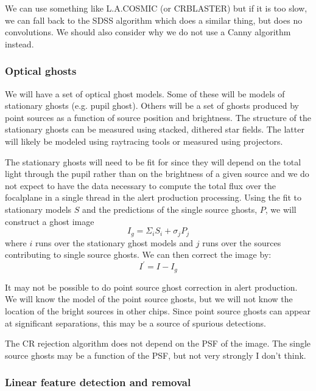 \begin{note}
We can use something like L.A.COSMIC (or CRBLASTER) but if it is too slow, we can fall back to the SDSS algorithm which does a similar thing, but does no convolutions.
We should also consider why we do not use a Canny algorithm instead.
\end{note}

\subsubsection{Optical ghosts}
We will have a set of optical ghost models.  Some of these will be models of stationary ghosts (e.g. pupil
ghost). Others will be a set of ghosts produced by point sources as a function of source position and
brightness. The structure of the stationary ghosts can be measured using stacked, dithered star fields.  The latter will likely be modeled using raytracing tools or measured using projectors.

The stationary ghosts will need to be fit for since they will depend on the total light through the pupil rather than on the brightness of a given source and we do not expect to have the data necessary to compute the total flux over the focalplane in a single thread in the alert production processing.  Using the fit to stationary models $S$ and the predictions of the single source ghosts, $P$, we will construct a ghost image
\[
I_g = \Sigma_i S_i + \sigma_j P_{j}
\]
where $i$ runs over the stationary ghost models and $j$ runs over the sources contributing to single source ghosts.  We can then correct the image by:
\[
I^\prime = I - I_g
\]

\begin{note}
It may not be possible to do point source ghost correction in alert production.  We will know the model of the
point source ghosts, but we will not know the location of the bright sources in other chips.  Since point
source ghosts can appear at significant separations, this may be a source of spurious detections.
\end{note}

\begin{note}
The CR rejection algorithm does not depend on the PSF of the image.  The single source ghosts may be a function of the PSF, but not very strongly I don't think.
\end{note}

\subsubsection{Linear feature detection and removal}

